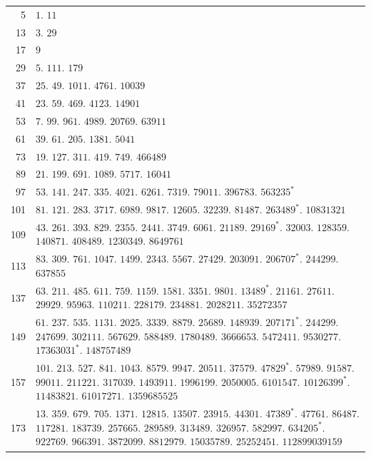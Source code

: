 \par\medskip
\begingroup\small\setlength{\tabcolsep}{5pt}
\begin{longtable}{@{}r|p{\dimexpr\linewidth-38pt\relax}@{}}
5 & $1.$ $11$\\
13 & $3.$ $29$\\
17 & $9$\\
29 & $5.$ $111.$ $179$\\
37 & $25.$ $49.$ $1011.$ $4761.$ $10039$\\
41 & $23.$ $59.$ $469.$ $4123.$ $14901$\\
53 & $7.$ $99.$ $961.$ $4989.$ $20769.$ $63911$\\
61 & $39.$ $61.$ $205.$ $1381.$ $5041$\\
73 & $19.$ $127.$ $311.$ $419.$ $749.$ $466489$\\
89 & $21.$ $199.$ $691.$ $1089.$ $5717.$ $16041$\\
97 & $53.$ $141.$ $247.$ $335.$ $4021.$ $6261.$ $7319.$ $79011.$ $396783.$ $563235^{*}$\\
101 & $81.$ $121.$ $283.$ $3717.$ $6989.$ $9817.$ $12605.$ $32239.$ $81487.$ $263489^{*}.$ $10831321$\\
109 & $43.$ $261.$ $393.$ $829.$ $2355.$ $2441.$ $3749.$ $6061.$ $21189.$ $29169^{*}.$ $32003.$ $128359.$ $140871.$ $408489.$ $1230349.$ $8649761$\\
113 & $83.$ $309.$ $761.$ $1047.$ $1499.$ $2343.$ $5567.$ $27429.$ $203091.$ $206707^{*}.$ $244299.$ $637855$\\
137 & $63.$ $211.$ $485.$ $611.$ $759.$ $1159.$ $1581.$ $3351.$ $9801.$ $13489^{*}.$ $21161.$ $27611.$ $29929.$ $95963.$ $110211.$ $228179.$ $234881.$ $2028211.$ $35272357$\\
149 & $61.$ $237.$ $535.$ $1131.$ $2025.$ $3339.$ $8879.$ $25689.$ $148939.$ $207171^{*}.$ $244299.$ $247699.$ $302111.$ $567629.$ $588489.$ $1780489.$ $3666653.$ $5472411.$ $9530277.$ $17363031^{*}.$ $148757489$\\
157 & $101.$ $213.$ $527.$ $841.$ $1043.$ $8579.$ $9947.$ $20511.$ $37579.$ $47829^{*}.$ $57989.$ $91587.$ $99011.$ $211221.$ $317039.$ $1493911.$ $1996199.$ $2050005.$ $6101547.$ $10126399^{*}.$ $11483821.$ $61017271.$ $1359685525$\\
173 & $13.$ $359.$ $679.$ $705.$ $1371.$ $12815.$ $13507.$ $23915.$ $44301.$ $47389^{*}.$ $47761.$ $86487.$ $117281.$ $183739.$ $257665.$ $289589.$ $313489.$ $326957.$ $582997.$ $634205^{*}.$ $922769.$ $966391.$ $3872099.$ $8812979.$ $15035789.$ $25252451.$ $112899039159$\\

\end{longtable}
